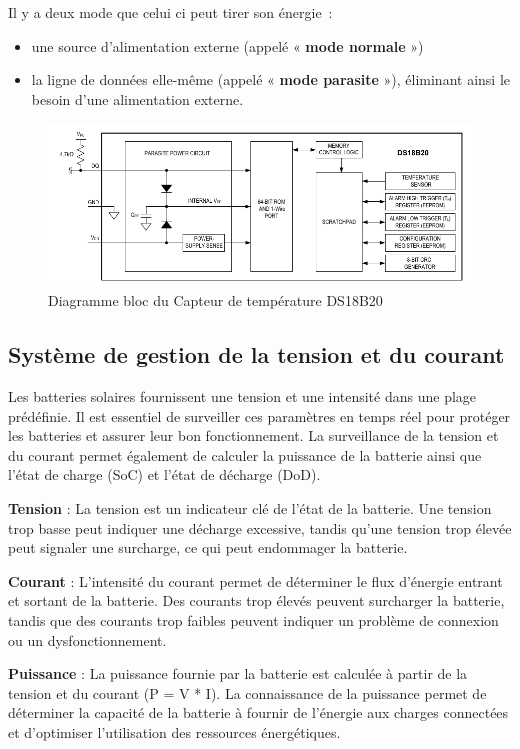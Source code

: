Il y a deux mode que celui ci peut tirer son énergie :
\begin{itemize}
	\item une source d'alimentation externe (appelé «\textbf{ mode normale} »)
	\item la ligne de données elle-même (appelé «\textbf{ mode parasite} »), éliminant ainsi le besoin d'une alimentation externe.
\end{itemize}

\begin{figure}[H]
	\centering
	\includegraphics[width=15cm]{./img/blocDiagramDS18B20.png}
	\caption{Diagramme bloc du Capteur de température DS18B20 }
	\label{i1}
\end{figure}

\subsection*{Système de gestion de la tension et du courant}
Les batteries solaires fournissent une tension et une intensité dans une plage prédéfinie. Il est essentiel de surveiller ces paramètres en temps réel pour protéger les batteries et assurer leur bon fonctionnement. La surveillance de la tension et du courant permet également de calculer la puissance de la batterie ainsi que l'état de charge (SoC) et l'état de décharge (DoD).
\\

\begin{filleditem}
	\item \textbf{Tension} : La tension est un indicateur clé de l'état de la batterie. Une tension trop basse peut indiquer une décharge excessive, tandis qu'une tension trop élevée peut signaler une surcharge, ce qui peut endommager la batterie.
	\item	\textbf{Courant} : L'intensité du courant permet de déterminer le flux d'énergie entrant et sortant de la batterie. Des courants trop élevés peuvent surcharger la batterie, tandis que des courants trop faibles peuvent indiquer un problème de connexion ou un dysfonctionnement.
	\item	\textbf{Puissance} : La puissance fournie par la batterie est calculée à partir de la tension et du courant (P = V * I). La connaissance de la puissance permet de déterminer la capacité de la batterie à fournir de l'énergie aux charges connectées et d'optimiser l'utilisation des ressources énergétiques.
\end{filleditem}	
